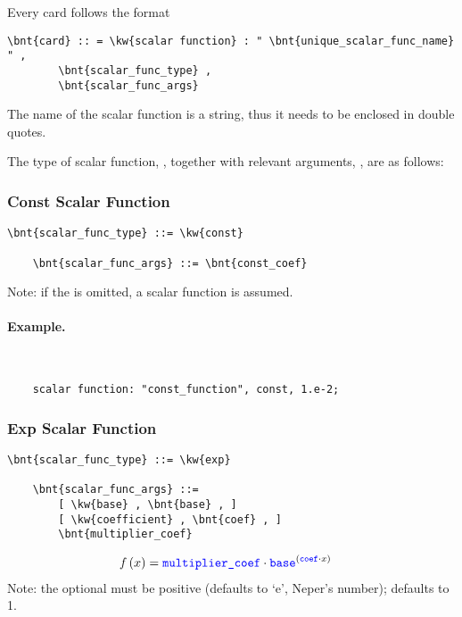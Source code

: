 \noindent
Every  card follows the format
\begin{Verbatim}[commandchars=\\\{\}]
    \bnt{card} :: = \kw{scalar function} : " \bnt{unique_scalar_func_name} " , 
        \bnt{scalar_func_type} ,
        \bnt{scalar_func_args}
\end{Verbatim}
The name of the scalar function is a string, thus it needs to be enclosed
in double quotes.

The type of scalar function,
, together 
with relevant arguments, ,
are as follows:
\subsubsection{Const Scalar Function}
\begin{Verbatim}[commandchars=\\\{\}]
    \bnt{scalar_func_type} ::= \kw{const}

    \bnt{scalar_func_args} ::= \bnt{const_coef}
\end{Verbatim}
Note: if the  is omitted,
a  scalar function is assumed.

\paragraph{Example.} \
\begin{verbatim}
    scalar function: "const_function", const, 1.e-2;
\end{verbatim}

\subsubsection{Exp Scalar Function}
\begin{Verbatim}[commandchars=\\\{\}]
    \bnt{scalar_func_type} ::= \kw{exp}

    \bnt{scalar_func_args} ::=
        [ \kw{base} , \bnt{base} , ]
        [ \kw{coefficient} , \bnt{coef} , ]
        \bnt{multiplier_coef}
\end{Verbatim}
\begin{align}
	f\left( x \right)
	&=
	\textcolor{blue}{\texttt{multiplier\_coef}} \cdot \textcolor{blue}{\texttt{base}}^{\left( \textcolor{blue}{\texttt{coef}} \cdot x \right)}
\end{align}
Note: the optional  must be positive
(defaults to `$\textrm{e}$', Neper's number);
 defaults to 1.


